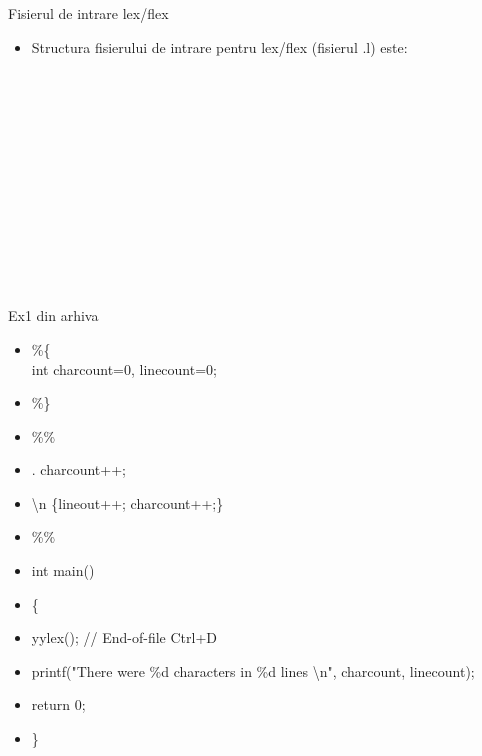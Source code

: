 \documentclass[pdf]{beamer}
\begin{document}
\begin{frame}{Fisierul de intrare lex/flex}
\begin{itemize}
\item
Structura fisierului de intrare pentru lex/flex (fisierul .l) este:
 \\~\\
    \color{red}{\%\{ } \\
    \color{red}{define and include directives of cpp} \\
    \color{red}{ \%\} } \\
    \color{red}{definitions} \\~\\
    \color{black}{\%\%} \\~\\
    \color{green}{rules} \\~\\
    \color{black}{\%\%} \\~\\
    \color{blue}{user defined routines}

\end{itemize}
\end{frame}



\begin{frame}{Ex1 din arhiva}
\begin{itemize}
\item[]
\%\{ \\
int charcount=0, linecount=0; \\
\item[]
\%\} \\
\item[]
\%\%
\item[]
. charcount++;
\item[]
\textbackslash n \{lineout++; charcount++;\}
\item[]
\%\%
\item[]
int main()
\item[]
\{
\item[]
yylex(); // End-of-file Ctrl+D
\item[]
printf("There were \%d characters in \%d lines \textbackslash n", charcount, linecount);
\item[]
return 0;
\item[]
\}
\end{itemize}
\end{frame}
\end{document}
